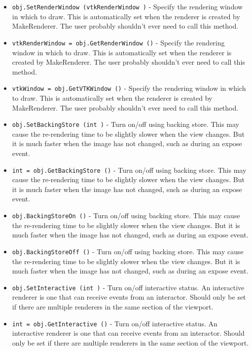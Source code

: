 \begin{itemize}
\item  \verb|obj.SetRenderWindow (vtkRenderWindow )| -  Specify the rendering window in which to draw. This is automatically set
 when the renderer is created by MakeRenderer.  The user probably
 shouldn't ever need to call this method.

\item  \verb|vtkRenderWindow = obj.GetRenderWindow ()| -  Specify the rendering window in which to draw. This is automatically set
 when the renderer is created by MakeRenderer.  The user probably
 shouldn't ever need to call this method.

\item  \verb|vtkWindow = obj.GetVTKWindow ()| -  Specify the rendering window in which to draw. This is automatically set
 when the renderer is created by MakeRenderer.  The user probably
 shouldn't ever need to call this method.

\item  \verb|obj.SetBackingStore (int )| -  Turn on/off using backing store. This may cause the re-rendering
 time to be slightly slower when the view changes. But it is
 much faster when the image has not changed, such as during an
 expose event.

\item  \verb|int = obj.GetBackingStore ()| -  Turn on/off using backing store. This may cause the re-rendering
 time to be slightly slower when the view changes. But it is
 much faster when the image has not changed, such as during an
 expose event.

\item  \verb|obj.BackingStoreOn ()| -  Turn on/off using backing store. This may cause the re-rendering
 time to be slightly slower when the view changes. But it is
 much faster when the image has not changed, such as during an
 expose event.

\item  \verb|obj.BackingStoreOff ()| -  Turn on/off using backing store. This may cause the re-rendering
 time to be slightly slower when the view changes. But it is
 much faster when the image has not changed, such as during an
 expose event.

\item  \verb|obj.SetInteractive (int )| -  Turn on/off interactive status.  An interactive renderer is one that
 can receive events from an interactor.  Should only be set if
 there are multiple renderers in the same section of the viewport.

\item  \verb|int = obj.GetInteractive ()| -  Turn on/off interactive status.  An interactive renderer is one that
 can receive events from an interactor.  Should only be set if
 there are multiple renderers in the same section of the viewport.


\end{itemize}
